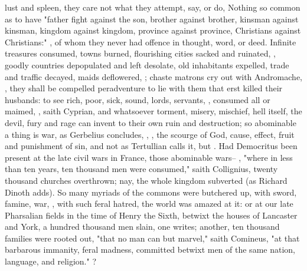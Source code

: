 lust and spleen, they care not what they attempt, say, or do,
Nothing so common as to have "father fight against the son,
brother against brother, kinsman against kinsman, kingdom against kingdom,
province against province, Christians against Christians:" , of whom they never had offence in thought,
word, or deed. Infinite treasures consumed, towns burned, flourishing cities
sacked and ruinated, , goodly countries
depopulated and left desolate, old inhabitants expelled, trade and traffic
decayed, maids deflowered, ; chaste matrons cry out with Andromache,
, they shall be compelled peradventure to lie with them that erst
killed their husbands: to see rich, poor, sick, sound, lords, servants,
, consumed all or maimed, \etc{} , saith Cyprian, and
whatsoever torment, misery, mischief, hell itself, the devil,
fury and rage can invent to their own ruin and destruction;
so abominable a thing is war, as Gerbelius concludes,
, \etc{}, the scourge of God, cause, effect, fruit and punishment
of sin, and not  as Tertullian calls it, but
. Had Democritus been present at the late civil wars in France, those
abominable wars-- , "where
in less than ten years, ten thousand men were consumed," saith Collignius,
twenty thousand churches overthrown; nay, the whole kingdom subverted (as
Richard Dinoth adds). So many myriads of the commons were
butchered up, with sword, famine, war, , with such feral hatred, the world was
amazed at it: or at our late Pharsalian fields in the time of Henry the Sixth,
betwixt the houses of Lancaster and York, a hundred thousand men slain,
one writes; another, ten thousand
families were rooted out, "that no man can but marvel," saith Comineus, "at
that barbarous immanity, feral madness, committed betwixt men of the same
nation, language, and religion." ?
